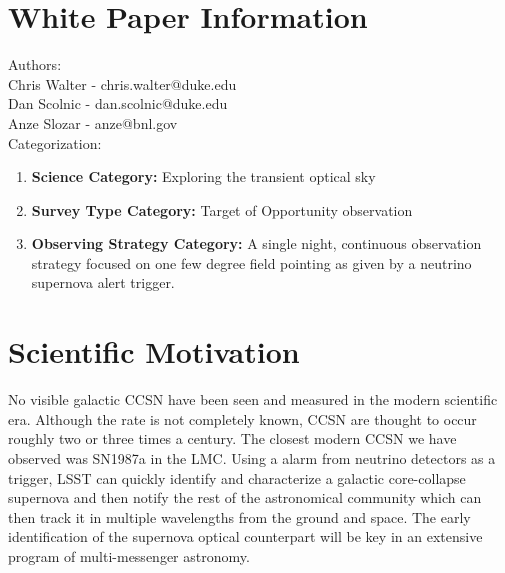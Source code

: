 \documentclass[12pt, letterpaper]{article}
\begin{document}
\section{White Paper Information}

\noindent
Authors: \\

\noindent
Chris Walter - chris.walter@duke.edu \\
Dan Scolnic - dan.scolnic@duke.edu \\
Anze Slozar - anze@bnl.gov \\

\noindent
Categorization: 
\begin{enumerate} 
\item {\bf Science Category:}  Exploring the transient optical sky
\item {\bf Survey Type Category:}  Target of Opportunity observation
\item {\bf Observing Strategy Category:}  A single night, continuous
  observation strategy focused on one few degree field pointing as given by
  a neutrino supernova alert trigger.
\end{enumerate}  

\clearpage

\section{Scientific Motivation}
\label{sec:motivation}

No visible galactic CCSN have been seen and measured in the modern
scientific era.  Although the rate is not completely known, CCSN are
thought to occur roughly two or three times a century.  The closest
modern CCSN we have observed was SN1987a in the LMC.  Using a alarm
from neutrino detectors as a trigger, LSST can quickly identify and
characterize a galactic core-collapse supernova and then notify the
rest of the astronomical community which can then track it in multiple
wavelengths from the ground and space.  The early identification of
the supernova optical counterpart will be key in an extensive program
of multi-messenger astronomy.
\end{document}

